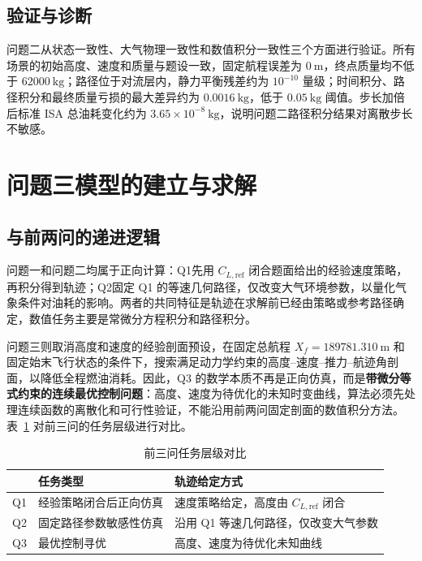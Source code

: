 \documentclass[withoutpreface,bwprint]{cumcmthesis}
\begin{document}
\subsection{验证与诊断}

问题二从状态一致性、大气物理一致性和数值积分一致性三个方面进行验证。所有场景的初始高度、速度和质量与题设一致，固定航程误差为 $0\ \mathrm{m}$，终点质量均不低于 $62000\ \mathrm{kg}$；路径位于对流层内，静力平衡残差约为 $10^{-10}$ 量级；时间积分、路径积分和最终质量亏损的最大差异约为 $0.0016\ \mathrm{kg}$，低于 $0.05\ \mathrm{kg}$ 阈值。步长加倍后标准 ISA 总油耗变化约为 $3.65\times10^{-8}\ \mathrm{kg}$，说明问题二路径积分结果对离散步长不敏感。

\section{问题三模型的建立与求解}

\subsection{与前两问的递进逻辑}

问题一和问题二均属于正向计算：Q1先用 $C_{L,\mathrm{ref}}$ 闭合题面给出的经验速度策略，再积分得到轨迹；Q2固定 Q1 的等速几何路径，仅改变大气环境参数，以量化气象条件对油耗的影响。两者的共同特征是轨迹在求解前已经由策略或参考路径确定，数值任务主要是常微分方程积分和路径积分。

问题三则取消高度和速度的经验剖面预设，在固定总航程 $X_f=189781.310\ \mathrm{m}$ 和固定始末飞行状态的条件下，搜索满足动力学约束的高度--速度--推力--航迹角剖面，以降低全程燃油消耗。因此，Q3 的数学本质不再是正向仿真，而是\textbf{带微分等式约束的连续最优控制问题}：高度、速度为待优化的未知时变曲线，算法必须先处理连续函数的离散化和可行性验证，不能沿用前两问固定剖面的数值积分方法。表~\ref{tab:q3_task_comparison} 对前三问的任务层级进行对比。

\begin{table}[H]
\centering\caption{前三问任务层级对比}\label{tab:q3_task_comparison}
\begin{tabular}{cll}\toprule
 & 任务类型 & 轨迹给定方式 \\ \midrule
Q1 & 经验策略闭合后正向仿真 & 速度策略给定，高度由 $C_{L,\mathrm{ref}}$ 闭合 \\
Q2 & 固定路径参数敏感性仿真 & 沿用 Q1 等速几何路径，仅改变大气参数 \\
Q3 & 最优控制寻优 & 高度、速度为待优化未知曲线 \\
\bottomrule
\end{tabular}
\end{table}
\end{document}
